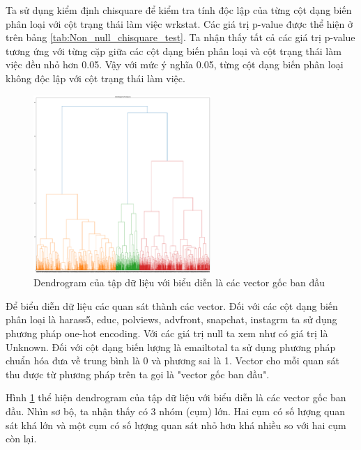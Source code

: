 Ta sử dụng kiểm định chisquare để kiểm tra tính độc lập của từng cột dạng biến phân loại với cột trạng thái làm việc wrkstat.
Các giá trị p-value được thể hiện ở trên bảng \ref{tab:Non_null_chisquare_test}.
Ta nhận thấy tất cả các giá trị p-value tương ứng với từng cặp giữa các cột dạng biến phân loại và cột trạng thái làm việc đều nhỏ hơn 0.05.
Vậy với mức ý nghĩa 0.05, từng cột dạng biến phân loại không độc lập với cột trạng thái làm việc.

\begin{figure}[H]
    \centering
    \includegraphics[width=0.6\textwidth]{figures/Thanh/Data_Analysis/Non_null_dendrogram_original_features.png}
    \caption{Dendrogram của tập dữ liệu với biểu diễn là các vector gốc ban đầu}
    \label{fig:Non_null_dendrogram_original_features}
\end{figure}

Để biểu diễn dữ liệu các quan sát thành các vector.
Đối với các cột dạng biến phân loại là harass5, educ, polviews, advfront, snapchat, instagrm ta sử dụng phương pháp one-hot encoding.
Với các giá trị null ta xem như có giá trị là Unknown.
Đối với cột dạng biến lượng là emailtotal ta sử dụng phương pháp chuẩn hóa đưa về trung bình là 0 và phương sai là 1.
Vector cho mỗi quan sát thu được từ phương pháp trên ta gọi là "vector gốc ban đầu".

Hình \ref{fig:Non_null_dendrogram_original_features} thể hiện dendrogram của tập dữ liệu với biểu diễn là các vector gốc ban đầu.
Nhìn sơ bộ, ta nhận thấy có 3 nhóm (cụm) lớn. Hai cụm có số lượng quan sát khá lớn và một cụm có số lượng quan sát nhỏ hơn khá nhiều so với hai cụm còn lại.


